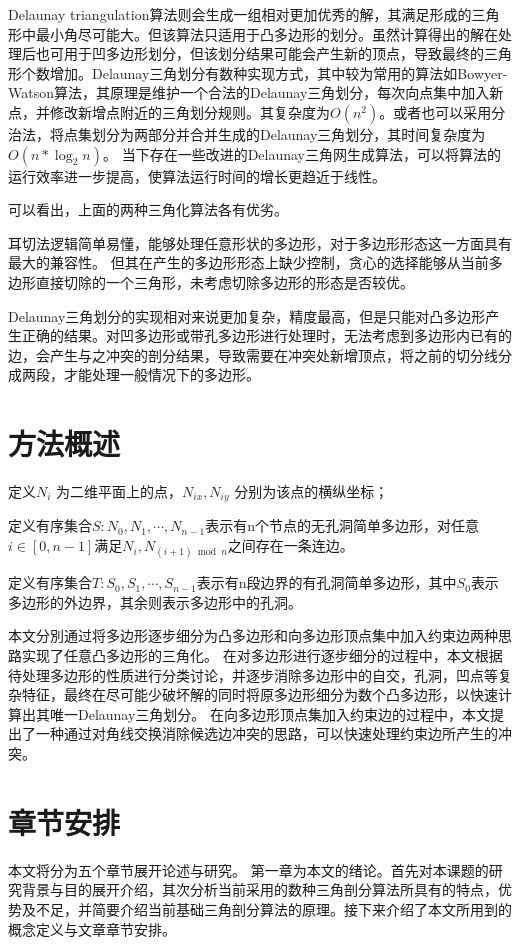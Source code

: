 Delaunay triangulation算法则会生成一组相对更加优秀的解，其满足形成的三角形中最小角尽可能大。但该算法只适用于凸多边形的划分。虽然计算得出的解在处理后也可用于凹多边形划分，但该划分结果可能会产生新的顶点，导致最终的三角形个数增加。Delaunay三角划分有数种实现方式，其中较为常用的算法如Bowyer-Watson算法，其原理是维护一个合法的Delaunay三角划分，每次向点集中加入新点，并修改新增点附近的三角划分规则。其复杂度为\(O(n^2)\)。或者也可以采用分治法，将点集划分为两部分并合并生成的Delaunay三角划分，其时间复杂度为\(O(n*\log_2n)\)。
当下存在一些改进的Delaunay三角网生成算法，可以将算法的运行效率进一步提高，使算法运行时间的增长更趋近于线性。

可以看出，上面的两种三角化算法各有优劣。

耳切法逻辑简单易懂，能够处理任意形状的多边形，对于多边形形态这一方面具有最大的兼容性。
但其在产生的多边形形态上缺少控制，贪心的选择能够从当前多边形直接切除的一个三角形，未考虑切除多边形的形态是否较优。

Delaunay三角划分的实现相对来说更加复杂，精度最高，但是只能对凸多边形产生正确的结果。对凹多边形或带孔多边形进行处理时，无法考虑到多边形内已有的边，会产生与之冲突的剖分结果，导致需要在冲突处新增顶点，将之前的切分线分成两段，才能处理一般情况下的多边形。

\section{方法概述}

定义\(N_i\) 为二维平面上的点，\(N_{ix},N_{iy}\) 分别为该点的横纵坐标；

定义有序集合\(S:N_0,N_1,\cdots,N_{n-1}\)表示有n个节点的无孔洞简单多边形，对任意\(i\in [0,n-1] \)满足\(N_i,N_{(i+1) \bmod n}\)之间存在一条连边。

定义有序集合\(T:S_0,S_1,\cdots,S_{n-1}\)表示有n段边界的有孔洞简单多边形，其中\(S_0\)表示多边形的外边界，其余则表示多边形中的孔洞。

本文分別通过将多边形逐步细分为凸多边形和向多边形顶点集中加入约束边两种思路实现了任意凸多边形的三角化。
在对多边形进行逐步细分的过程中，本文根据待处理多边形的性质进行分类讨论，并逐步消除多边形中的自交，孔洞，凹点等复杂特征，最终在尽可能少破坏解的同时将原多边形细分为数个凸多边形，以快速计算出其唯一Delaunay三角划分。
在向多边形顶点集加入约束边的过程中，本文提出了一种通过对角线交换消除候选边冲突的思路，可以快速处理约束边所产生的冲突。
\section{章节安排}
本文将分为五个章节展开论述与研究。
第一章为本文的绪论。首先对本课题的研究背景与目的展开介绍，其次分析当前采用的数种三角剖分算法所具有的特点，优势及不足，并简要介绍当前基础三角剖分算法的原理。接下来介绍了本文所用到的概念定义与文章章节安排。

